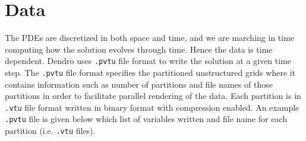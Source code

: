%

\section{Data}
The PDEs are discretized in both space and time, and we are marching in time computing how the solution evolves through time. Hence the data is time dependent. Dendro uses \texttt{.pvtu} file format to write the solution at a given time step. The \texttt{.pvtu} file format specifies the partitioned unstructured grids where it contains information such as number of partitions and file names of those partitions in order to facilitate parallel rendering of the data. Each partition is in \texttt{.vtu} file format written in binary format with compression enabled. An example \texttt{.pvtu} file is given below which list of variables written and file name for each partition (i.e. \texttt{.vtu} files). 
